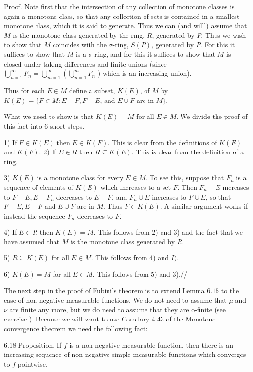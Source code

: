 {{{Proof. Note first that the intersection of any collection of monotone classes is again a monotone class, so that any collection of sets is contained in a smallest monotone class, which it is said to generate. Thus we can (and willl) assume that $M$ is the monotone class generated by the ring, $R$, generated by $P$. Thus we wish to show that $M$ coincides with the $\sigma$-ring, $S(P)$, generated by $P$. For this it suffices to show that $M$ is a $\sigma$-ring, and for this it suffices to show that $M$ is closed under taking differences and finite unions (since $\bigcup_{n=1}^{\infty} F_{n}=\bigcup_{m=1}^{\infty}\left(\bigcup_{n=1}^{m} F_{n}\right.$ ) which is an increasing union).

Thus for each $E \in M$ define a subset, $K(E)$, of $M$ by $K(E)=\{F \in M: E-F, F-E$, and $E \cup F$ are in $M\}$.

What we need to show is that $K(E)=M$ for all $E \in M$. We divide the proof of this fact into 6 short steps.

1) If $F \in K(E)$ then $E \in K(F)$. This is clear from the definitions of $K(E)$ and $K(F)$. 2) If $E \in R$ then $R \subseteq K(E)$. This is clear from the definition of a ring.

3) $K(E)$ is a monotone class for every $E \in M$. To see this, suppose that $F_{n}$ is a sequence of elements of $K(E)$ which increases to a set $F$. Then $F_{n}-E$ increases to $F-E, E-F_{n}$ decreases to $E-F$, and $F_{n} \cup E$ increases to $F \cup E$, so that $F-E, E-F$ and $E \cup F$ are in $M$. Thus $F \in K(E)$. A similar argument works if instead the sequence $F_{n}$ decreases to $F$.

4) If $E \in R$ then $K(E)=M$. This follows from 2) and 3) and the fact that we have assumed that $M$ is the monotone class generated by $R$.

5) $R \subseteq K(E)$ for all $E \in M$. This follows from 4) and $I)$.

6) $K(E)=M$ for all $E \in M$. This follows from 5) and 3).//

The next step in the proof of Fubini's theorem is to extend Lemma $6.15$ to the case of non-negative measurable functions. We do not need to assume that $\mu$ and $\nu$ are finite any more, but we do need to assume that they are o-finite (see exercise ). Because we will want to use Corollary $4.43$ of the Monotone convergence theorem we need the following fact:

6.18 Proposition. If $f$ is a non-negative measurable function, then there is an increasing sequence of non-negative simple measurable functions which converges to $f$ pointwise.

}}}
